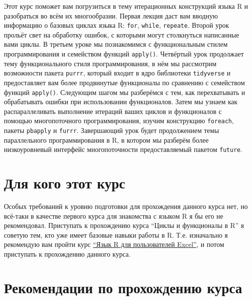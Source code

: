 \documentclass[
]{book}
\begin{document}
Этот курс поможет вам погрузиться в тему итерационных конструкций языка R и разобраться во всём их многообразии. Первая лекция даст вам вводную информацию о базовых циклах языка R: \texttt{for}, \texttt{while}, \texttt{repeate}. Второй урок прольёт свет на обработку ошибок, с которыми могут столкнуться написанные вами циклы. В третьем уроке мы познакомимся с функциональным стилем программирования и семейством функций \texttt{apply()}. Четвёртый урок продолжает тему функционального стиля программирования, в нём мы рассмотрим возможности пакета \texttt{purrr}, который входит в ядро библиотеки \texttt{tidyverse} и предоставляет вам более продвинутые функционалы по сравнению с семейством функций \texttt{apply()}. Следующим шагом мы разберёмся с тем, как перехватывать и обрабатывать ошибки при использовании функционалов. Затем мы узнаем как распараллеливать выполнение итераций ваших циклов и функционалов с помощью многопоточного программирования, изучим конструкцию \texttt{foreach}, пакеты \texttt{pbapply} и \texttt{furrr}. Завершающий урок будет продолжением темы параллельного программирования в R, в котором мы разберём более низкоуровневый интерфейс многопоточности предоставляемый пакетом \texttt{future}.

\hypertarget{ux434ux43bux44f-ux43aux43eux433ux43e-ux44dux442ux43eux442-ux43aux443ux440ux441}{%
\section*{Для кого этот курс}\label{ux434ux43bux44f-ux43aux43eux433ux43e-ux44dux442ux43eux442-ux43aux443ux440ux441}}

Особых требований к уровню подготовки для прохождения данного курса нет, но всё-таки в качестве первого курса для знакомства с языком R я бы его не рекомендовал. Приступать к прохождению курса ``Циклы и функционалы в R'' я советую тем, кто уже имеет базовые навыки работы в R. Т.е. изначально я рекомендую вам пройти курс \href{https://alexey-seleznev.pro/r4excel_users/}{``Язык R для пользователей Excel''}, и потом приступать к прохождению данного курса.

\hypertarget{ux440ux435ux43aux43eux43cux435ux43dux434ux430ux446ux438ux438-ux43fux43e-ux43fux440ux43eux445ux43eux436ux434ux435ux43dux438ux44e-ux43aux443ux440ux441ux430}{%
\section*{Рекомендации по прохождению курса}\label{ux440ux435ux43aux43eux43cux435ux43dux434ux430ux446ux438ux438-ux43fux43e-ux43fux440ux43eux445ux43eux436ux434ux435ux43dux438ux44e-ux43aux443ux440ux441ux430}}
\end{document}
